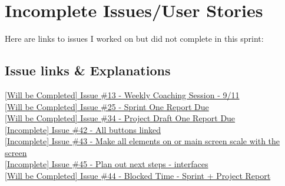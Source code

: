 \documentclass{article}
\begin{document}
\newpage

\section{Incomplete Issues/User Stories}
Here are links to issues I worked on but did not complete in this sprint:
\subsection{Issue links \& Explanations}
\href{https://github.com/zachA214/Adelson_Senior_Capstone/issues/13}{[Will be Completed] Issue \#13 - Weekly Coaching Session - 9/11} \\
\noindent{}
\href{https://github.com/zachA214/Adelson_Senior_Capstone/issues/25}{[Will be Completed] Issue \#25 - Sprint One Report Due} \\
\noindent{}
\href{https://github.com/zachA214/Adelson_Senior_Capstone/issues/34}{[Will be Completed] Issue \#34 - Project Draft One Report Due} \\
\noindent{}
\href{https://github.com/zachA214/Adelson_Senior_Capstone/issues/42}{[Incomplete] Issue \#42 - All buttons linked} \\
\noindent{}
\href{https://github.com/zachA214/Adelson_Senior_Capstone/issues/43}{[Incomplete] Issue \#43 - Make all elements on or main screen scale with the screen} \\
\noindent{}
\href{https://github.com/zachA214/Adelson_Senior_Capstone/issues/45}{[Incomplete] Issue \#45 - Plan out next steps - interfaces} \\
\noindent{}
\href{https://github.com/zachA214/Adelson_Senior_Capstone/issues/44}{[Will be Completed] Issue \#44 - Blocked Time - Sprint + Project Report} \\
\noindent{}
\newpage
\end{document}
